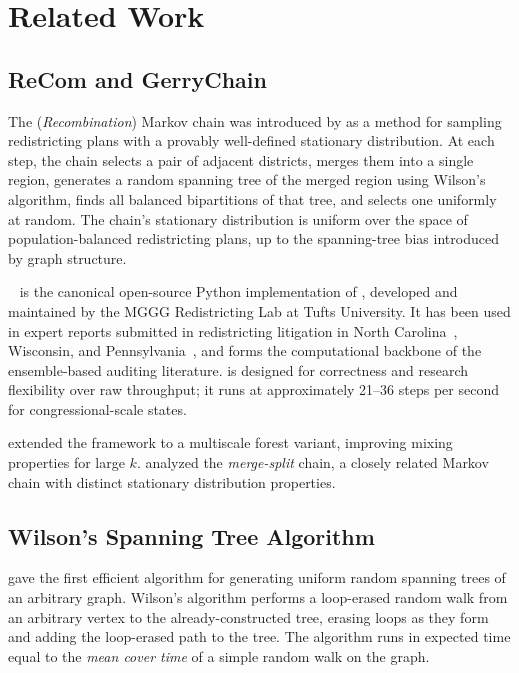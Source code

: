 \section{Related Work}
\label{sec:related}

\subsection{ReCom and GerryChain}

The \recom{} (\emph{Recombination}) Markov chain was introduced by
\citet{deford2021recombination} as a method for sampling redistricting
plans with a provably well-defined stationary distribution.
At each step, the chain selects a pair of adjacent districts, merges
them into a single region, generates a random spanning tree of the merged
region using Wilson's algorithm, finds all balanced bipartitions of that
tree, and selects one uniformly at random.
The chain's stationary distribution is uniform over the space of
population-balanced redistricting plans, up to the spanning-tree bias
introduced by graph structure.

\gc{}~\citep{gerrychain2021} is the canonical open-source Python
implementation of \recom{}, developed and maintained by the MGGG
Redistricting Lab at Tufts University.
It has been used in expert reports submitted in redistricting litigation
in North Carolina~\citep{herschlag2020quantifying}, Wisconsin, and
Pennsylvania~\citep{chikina2017assessing}, and forms the computational
backbone of the ensemble-based auditing literature.
\gc{} is designed for correctness and research flexibility over raw
throughput; it runs at approximately 21--36 steps per second for
congressional-scale states.

\citet{autry2021multiscale} extended the \recom{} framework to a
multiscale forest variant, improving mixing properties for large $k$.
\citet{carter2019merge} analyzed the \emph{merge-split} chain, a closely
related Markov chain with distinct stationary distribution properties.

\subsection{Wilson's Spanning Tree Algorithm}

\citet{wilson1996generating} gave the first efficient algorithm for
generating uniform random spanning trees of an arbitrary graph.
Wilson's algorithm performs a loop-erased random walk from an arbitrary
vertex to the already-constructed tree, erasing loops as they form and
adding the loop-erased path to the tree.
The algorithm runs in expected time equal to the \emph{mean cover time}
of a simple random walk on the graph.

